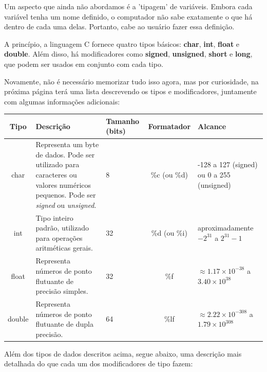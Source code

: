 Um aspecto que ainda não abordamos é a 'tipagem' de variáveis. Embora cada 
variável tenha um nome definido, o computador não sabe exatamente o que há 
dentro de cada uma delas. Portanto, cabe ao usuário fazer essa definição.

A princípio, a linguagem C fornece quatro tipos básicos: \textbf{char}, 
\textbf{int}, \textbf{float} e \textbf{double}. Além disso, há modificadores 
como \textbf{signed}, \textbf{unsigned}, \textbf{short} e \textbf{long}, que 
podem ser usados em conjunto com cada tipo.

Novamente, não é necessário memorizar tudo isso agora, mas por curiosidade, na 
próxima página terá uma lista descrevendo os tipos e modificadores, juntamente 
com algumas informações adicionais:

\newpage

\begin{center}
    \centering
    \begin{tabular}{|c|p{4cm}|p{2cm}|c|p{4cm}|}
        \hline
        \textbf{Tipo} & \textbf{Descrição} & \textbf{Tamanho (bits)} & \textbf{Formatador} & \textbf{Alcance} \\
        \hline
        char & Representa um byte de dados. Pode ser utilizado para caracteres ou valores numéricos pequenos. Pode ser \textit{signed} ou \textit{unsigned}. & 8 & \%c (ou \%d) & -128 a 127 (signed) ou 0 a 255 (unsigned) \\
        \hline
        int & Tipo inteiro padrão, utilizado para operações aritméticas gerais. & 32 & \%d (ou \%i) & aproximadamente $-2^{31}$ a $2^{31}-1$ \\
        \hline
        float & Representa números de ponto flutuante de precisão simples. & 32 & \%f & $\approx 1.17 \times 10^{-38}$ a $3.40 \times 10^{38}$ \\
        \hline
        double & Representa números de ponto flutuante de dupla precisão. & 64 & \%lf & $\approx 2.22 \times 10^{-308}$ a $1.79 \times 10^{308}$ \\
        \hline
    \end{tabular}
\end{center}

Além dos tipos de dados descritos acima, segue abaixo, uma descrição mais detalhada do que cada um dos 
modificadores de tipo fazem:

